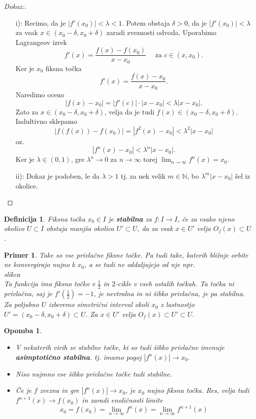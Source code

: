\documentclass{article}
\newtheorem{definicija}{Definicija}
\newtheorem{opomba}{Opomba}
\newtheorem{primer}{Primer}
\newcommand{\N}{\mathbb{N}}
\begin{document}
\begin{proof}[Dokaz:]
\begin{enumerate}
\item[i):] Recimo, da je $|f'(x_0)| < \lambda < 1$. Potem obstaja $\delta > 0$, da je $|f'(x_0)| < \lambda$ za vsak $x\in (x_0 - \delta, x_0 + \delta)$ zaradi zveznosti odvoda. Uporabimo Lagrangeov izrek
$$
f'(x) = \frac{f(x) - f(x_0)}{x - x_0} \quad \text{ za } c\in (x, x_0).
$$
Ker je $x_0$ fiksna točka
$$
f'(x) = \frac{f(x) - x_0}{x - x_0}.
$$
Naredimo oceno 
$$
|f(x) - x_0| = |f'(c)|\cdot |x - x_0| < \lambda |x - x_0|. 
$$
Zato za $x\in (x_0 - \delta, x_0 + \delta)$, velja da je tudi $f(x) \in (x_0 - \delta, x_0 + \delta)$. Indultivno sklepamo
$$
|f(f(x)) - f(x_0)| = |f^2(x) - x_0| < \lambda^2 |x - x_0|
$$
oz. 
$$
|f^n(x) - x_0| < \lambda^n |x - x_0|.
$$
Ker je $\lambda \in (0, 1)$, gre $\lambda^n \rightarrow 0$ za $n\rightarrow \infty$ torej $\lim_{n\rightarrow \infty} f^n(x) = x_0$.
\item[ii):] Dokaz je podoben, le da $\lambda > 1$ tj. za nek velik $m\in \N$, bo $\lambda^m |x - x_0|$ šel iz okolice.
\end{enumerate}
\end{proof}

\begin{definicija}
Fiksna točka $x_0 \in I$ je \textbf{stabilna} za $f:I \rightarrow I$, če za vsako njeno okolico $U \subset I$ obstaja manjša okolica $U' \subset U$, da za vsak $x\in U'$ velja $O_f(x) \subset U$.
\end{definicija}

\begin{primer}
Take so vse privlačne fiksne točke. Pa tudi take, katerih bližnje orbite ne konvergirajo nujno k $x_0$, a se tudi ne oddaljujejo od nje npr.\\
slikca\\ 
Ta funkcija ima fiksno točko v $\frac{1}{2}$ in $2$-cikle v vseh ostalih točkah. Ta točka ni privlačna, saj je $f'(\frac{1}{2}) = -1$, je nevtralna in ni šibko privlačna, je pa stabilna. Za poljubno $U$ izberemo simetrični interval okoli $x_0$ z lastnostjo $U' = (x_0 - \delta, x_0 + \delta) \subset U$. Za $x \in U'$ velja $O_f(x) \subset U' \subset U$.
\end{primer}

\begin{opomba}
\hfill
\begin{itemize}
\item V nekaterih virih se stabilne točke, ki so tudi šibko privlačne imenuje \textbf{asimptotično stabilna}. tj. imamo pogoj $|f^n(x)| \rightarrow x_0$.
\item Niso nujmno vse šibko privlačne točke tudi stabilne.
\item Če je $f$ zvezna in gre $|f^n(x)| \rightarrow x_0$, je $x_0$ nujno fiksna točka. Res, velja tudi $f^{n+1}(x) \rightarrow f(x_0)$ in zaradi enoličnosti limite 
$$
x_0 = f(x_0) = \lim_{n\rightarrow \infty} f^{n}(x) = \lim_{n\rightarrow \infty} f^{n + 1}(x)
$$
\end{itemize}
\end{opomba}
\end{document}

